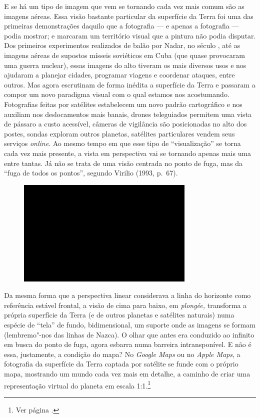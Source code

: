 E se há um tipo de imagem que vem se tornando cada vez mais comum são as
imagens aéreas. Essa visão bastante particular da superfície da Terra
foi uma das primeiras demonstrações daquilo que a fotografia --- e apenas
a fotografia --- podia mostrar; e marcaram um território visual que a
pintura não podia disputar. Dos primeiros experimentos realizados de
balão por Nadar, no século , até as imagens aéreas de supostos
mísseis soviéticos em Cuba (que quase provocaram uma guerra nuclear),
essas imagens do alto tiveram os mais diversos usos e nos ajudaram a
planejar cidades, programar viagens e coordenar ataques, entre outros.
Mas agora escrutinam de forma inédita a superfície da Terra e passaram a
compor um novo paradigma visual com o qual estamos nos acostumando.
Fotografias feitas por satélites estabelecem um novo padrão cartográfico
e nos auxiliam nos deslocamentos mais banais, drones teleguiados
permitem uma vista de pássaro a custo acessível, câmeras de vigilância
são posicionadas no alto dos postes, sondas exploram outros planetas,
satélites particulares vendem seus serviços \emph{online}. Ao mesmo
tempo em que esse tipo de ``visualização'' se torna cada vez mais
presente, a vista em perspectiva vai se tornando apenas mais uma entre
tantas. Já não se trata de uma visão centrada no ponto de fuga, mas da
``fuga de todos os pontos'', segundo Virilio (1993, p.~67).

\begin{figure}[!ht]
\centering
 \includegraphics[width=85mm]{./imgs/im1.jpg}
\caption{\tiny{}}
\end{figure}

Da mesma forma que a perspectiva linear considerava a linha do horizonte
como referência estável frontal, a visão de cima para baixo, em
\emph{plongée,} transforma a própria superfície da Terra (e de outros
planetas e satélites naturais) numa espécie de ``tela'' de fundo,
bidimensional, um suporte onde as imagens se formam (lembremo"-nos das
linhas de Nazca). O olhar que antes era conduzido ao infinito em busca
do ponto de fuga, agora esbarra numa barreira intransponível. E não é
essa, justamente, a condição do mapa? No \emph{Google Maps} ou no
\emph{Apple Maps}, a fotografia da superfície da Terra captada por
satélite se funde com o próprio mapa, mostrando um mundo cada vez mais
em detalhe, a caminho de criar uma representação virtual do planeta em
escala 1:1.\footnote{Ver página .}

